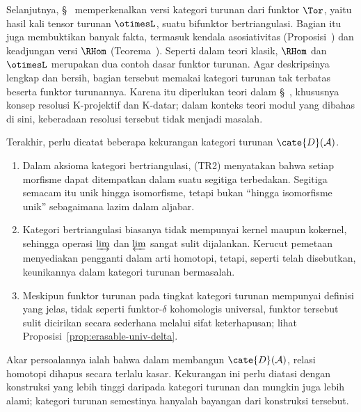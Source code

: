 Selanjutnya, \S~ memperkenalkan versi
kategori turunan dari funktor $\Tor$, yaitu hasil kali tensor turunan
$\otimesL$, suatu bifunktor bertriangulasi. Bagian itu juga membuktikan banyak
fakta, termasuk kendala asosiativitas
(Proposisi~) dan keadjungan versi $\RHom$
(Teorema~). Seperti
dalam teori klasik, $\RHom$ dan $\otimesL$ merupakan dua contoh dasar funktor
turunan. Agar deskripsinya lengkap dan bersih, bagian tersebut memakai
kategori turunan tak terbatas beserta funktor turunannya. Karena itu diperlukan
teori dalam \S~, khususnya konsep
resolusi K-projektif dan K-datar; dalam konteks teori modul yang dibahas di
sini, keberadaan resolusi tersebut tidak menjadi masalah.

Terakhir, perlu dicatat beberapa kekurangan kategori turunan
$\cate{D}(\mathcal{A})$.
\begin{enumerate}
	\item Dalam aksioma kategori bertriangulasi, (TR2) menyatakan bahwa setiap
	morfisme dapat ditempatkan dalam suatu segitiga terbedakan. Segitiga
	semacam itu unik hingga isomorfisme, tetapi bukan ``hingga isomorfisme
	unik'' sebagaimana lazim dalam aljabar.
	\item Kategori bertriangulasi biasanya tidak mempunyai kernel maupun
	kokernel, sehingga operasi $\varinjlim$ dan $\varprojlim$ sangat sulit
	dijalankan. Kerucut pemetaan menyediakan pengganti dalam arti homotopi,
	tetapi, seperti telah disebutkan, keunikannya dalam kategori turunan
	bermasalah.
	\item Meskipun funktor turunan pada tingkat kategori turunan mempunyai
	definisi yang jelas, tidak seperti funktor-$\delta$ kohomologis universal,
	funktor tersebut sulit dicirikan secara sederhana melalui sifat
	keterhapusan;
	lihat Proposisi~\ref{prop:erasable-univ-delta}.
\end{enumerate}

Akar persoalannya ialah bahwa dalam membangun $\cate{D}(\mathcal{A})$, relasi
homotopi dihapus secara terlalu kasar. Kekurangan ini perlu diatasi dengan
konstruksi yang lebih tinggi daripada kategori turunan dan mungkin juga lebih
alami; kategori turunan semestinya hanyalah bayangan dari konstruksi tersebut.

